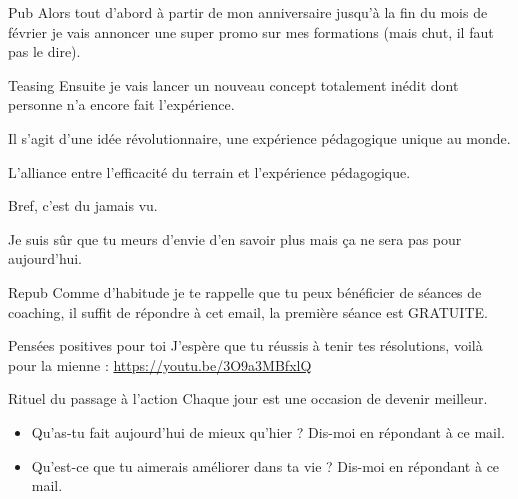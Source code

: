 \documentclass[presentation]{beamer}
\begin{document}
\begin{frame}[label={sec:org90e1457}]{Pub}
Alors tout d'abord à partir de mon anniversaire jusqu'à la fin du mois
de février je vais annoncer une super promo sur mes formations (mais
chut, il faut pas le dire).
\end{frame}



\begin{frame}[label={sec:orged7cd96}]{Teasing}
Ensuite je vais lancer un nouveau concept totalement inédit dont
personne n'a encore fait l'expérience.




Il s'agit d'une idée révolutionnaire, une expérience pédagogique
unique au monde.




L'alliance entre l'efficacité du terrain et l'expérience pédagogique.



Bref, c'est du jamais vu.



Je suis sûr que tu meurs d'envie d'en savoir plus mais ça ne sera pas
pour aujourd'hui.
\end{frame}



\begin{frame}[label={sec:org2c51758}]{Repub}
Comme d'habitude je te rappelle que tu peux bénéficier de séances de
coaching, il suffit de répondre à cet email, la première séance est
GRATUITE. 
\end{frame}



\begin{frame}[label={sec:org8f02797}]{Pensées positives pour toi}
J'espère que tu réussis à tenir tes résolutions, voilà pour la
mienne : \url{https://youtu.be/3O9a3MBfxlQ}
\end{frame}



\begin{frame}[label={sec:org6f7525a}]{Rituel du passage à l'action}
Chaque jour est une occasion de devenir meilleur.



\begin{itemize}
\item Qu'as-tu fait aujourd'hui de mieux qu'hier ? 
Dis-moi en répondant à ce mail.

\item Qu'est-ce que tu aimerais améliorer dans ta vie ? 
Dis-moi en répondant à ce mail.
\end{itemize}
\end{frame}
\end{document}
